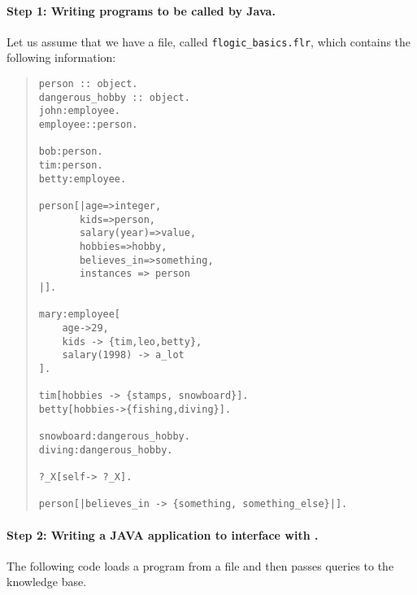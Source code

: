 \paragraph{Step 1: Writing \FLSYSTEM programs to be called by Java.}
  Let us assume that we have a file, called  {\tt flogic\_basics.flr},
  which contains the following information:
\begin{quote}
\begin{verbatim}
person :: object.
dangerous_hobby :: object.
john:employee.
employee::person.

bob:person.
tim:person.
betty:employee.

person[|age=>integer,
       kids=>person,
       salary(year)=>value,
       hobbies=>hobby,
       believes_in=>something,
       instances => person
|].

mary:employee[
    age->29,
    kids -> {tim,leo,betty},
    salary(1998) -> a_lot
].

tim[hobbies -> {stamps, snowboard}].
betty[hobbies->{fishing,diving}].

snowboard:dangerous_hobby.
diving:dangerous_hobby.

?_X[self-> ?_X].

person[|believes_in -> {something, something_else}|].
\end{verbatim}
\end{quote}

\paragraph{Step 2:  Writing a JAVA application to interface with \FLSYSTEM.}
 The following code loads a \FLSYSTEM program from a file and then passes
 queries to the knowledge base.

